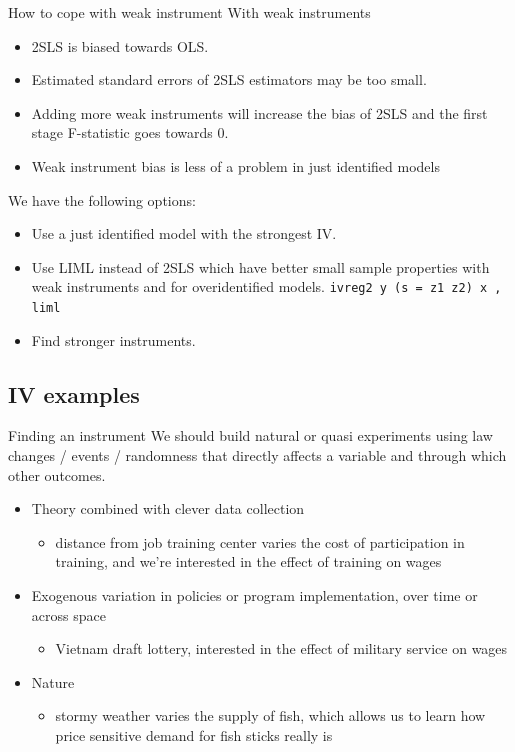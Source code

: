 \documentclass{beamer}
\begin{document}
\begin{frame}{How to cope with weak instrument}
With weak instruments
\begin{itemize}
\item 2SLS is biased towards OLS.
\item Estimated standard errors of 2SLS estimators may be too small.
\item Adding more weak instruments will increase the bias of 2SLS and the first stage F-statistic goes towards 0.
\item Weak instrument bias is less of a problem in just identified models 
\end{itemize}\medskip

We have the following options:
\begin{itemize}
\item Use a just identified model with the strongest IV.
\item Use LIML instead of 2SLS which have better small sample
properties with weak instruments and for overidentified models. \texttt{ivreg2 y (s = z1 z2) x , liml}
\item Find stronger instruments.
\end{itemize} 

\end{frame}

\subsection{IV examples}

\begin{frame}{Finding an instrument}
We should build natural or quasi experiments using law changes / events / randomness that directly affects a variable and through which other outcomes.
\begin{itemize}
\item Theory combined with clever data collection \begin{itemize}
\item distance from job training center varies the cost of participation in training, and we're interested in the effect of training on wages
\end{itemize}\medskip

\item Exogenous variation in policies or program implementation, over time or across space \begin{itemize}
\item Vietnam draft lottery, interested in the effect of military service on wages
\end{itemize}\medskip

\item Nature \begin{itemize}
\item stormy weather varies the supply of fish, which allows us to learn how price sensitive demand for fish sticks really is
\end{itemize}
\end{itemize}
\end{frame}
\end{document}
